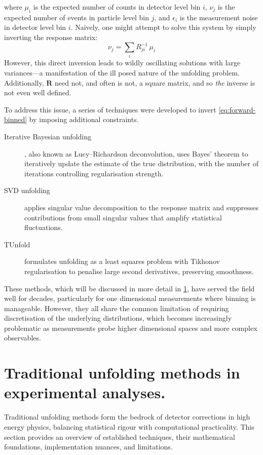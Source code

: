    where \(\mu_{i}\) is the expected number of counts in detector level bin \(i\), \(\nu_{j}\) is the expected number of events in particle level bin \(j\), and \(\epsilon_i\) is the measurement noise in detector level bin \(i\).
    Naively, one might attempt to solve this system by simply inverting the response matrix:
    \begin{equation}
        \nu_j = \sum_i R^{-1}_{ji}\,\mu_i
    \end{equation}
    However, this direct inversion leads to wildly oscillating solutions with large variances---a manifestation of the ill posed nature of the unfolding problem.
    Additionally, \(\mathbf{R}\) need not, and often is not, a square matrix, and so \emph{the} inverse is not even well defined.
    
    To address this issue, a series of techniques were developed to invert \cref{eq:forward-binned} by imposing additional constraints.
    \begin{description}
    \item[Iterative Bayesian unfolding~\cite{richardson_bayesian-based_1972, lucy_iterative_1974, Schmitt2017DataPhysics}], also known as Lucy--Richardson deconvolution, uses Bayes' theorem to iteratively update the estimate of the true distribution, with the number of iterations controlling regularisation strength.
    \item[SVD unfolding~\cite{hocker_svd_1996}] applies singular value decomposition to the response matrix and suppresses contributions from small singular values that amplify statistical fluctuations.
    \item[TUnfold~\cite{schmitt_tunfold_2012}] formulates unfolding as a least squares problem with Tikho\-nov regulari\-sation to penalise large second derivatives, preserving smooth\-ness.
    \end{description}

These methods, which will be discussed in more detail in \cref{sec:binned-methods}, have served the field well for decades, particularly for one dimensional measurements where binning is manageable.
%
However, they all share the common limitation of requiring discretisation of the underlying distributions, which becomes increasingly problematic as measurements probe higher dimensional spaces and more complex observables.


\section{Traditional unfolding methods in experimental analyses.}
\label{sec:binned-methods}
\sectionminitoc
Traditional unfolding methods form the bedrock of detector corrections in high energy physics, balancing statistical rigour with computational practicality.
%
This section provides an overview of established techniques, their mathematical foundations, implementation nuances, and limitations.

